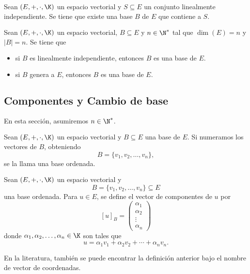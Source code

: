 \documentclass[a4,11pt]{aleph-notas}
\begin{document}
\begin{teo}
    Sean $(E,+,\cdot,\K)$ un espacio vectorial y $S\subseteq E$ un conjunto linealmente independiente. Se tiene que existe una base $B$ de $E$ que contiene a $S$.
\end{teo}


\begin{teo}
    Sean $(E,+,\cdot,\K)$ un espacio vectorial, $B\subseteq E$ y $n\in\N^*$ tal que $\dim(E)=n$ y $|B|=n$. Se tiene que
    \begin{itemize}
    \item
        si $B$ es linealmente independiente, entonces $B$ es una base de $E$.
    \item
        si $B$ genera a $E$, entonces $B$ es una base de $E$.
    \end{itemize}
\end{teo}


\subsection{Componentes y Cambio de base}

En esta sección, asumiremos $n\in\N^*$.

\begin{defi}
    Sean $(E,+,\cdot,\K)$ un espacio vectorial y $B\subseteq E$ una base de $E$. Si numeramos los vectores de $B$, obteniendo
    \[
        B = \{v_1,v_2,\ldots,v_n\},
    \]
    se la llama una base ordenada.
\end{defi}

\begin{defi}
    Sean $(E,+,\cdot,\K)$ un espacio vectorial y 
    \[
        B = \{v_1,v_2,\ldots,v_n\}\subseteq E
    \]
    una base ordenada. Para $u\in E$, se define el vector de componentes de $u$ por
    \[
        [u]_B = \begin{pmatrix}
            \alpha_1\\\alpha_2\\\vdots\\\alpha_n
        \end{pmatrix}
    \]
    donde $\alpha_1,\alpha_2,\ldots,\alpha_n\in\K$ son tales que
    \[
        u = \alpha_1 v_1+\alpha_2 v_2+\cdots+\alpha_n v_n.
    \]
\end{defi}

\begin{advertencia}
    En la literatura, también se puede encontrar la definición anterior bajo el nombre de vector de coordenadas.
\end{advertencia}
\end{document}
